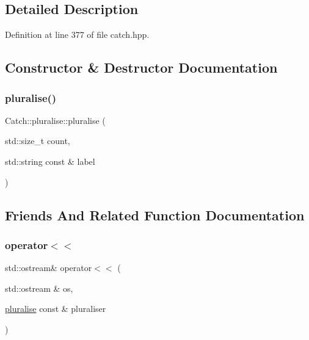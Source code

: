 \subsection{Detailed Description}


Definition at line 377 of file catch.\+hpp.



\subsection{Constructor \& Destructor Documentation}
\hypertarget{struct_catch_1_1pluralise_a5c55e22de2416cfe416edf715c6b9234}{}\label{struct_catch_1_1pluralise_a5c55e22de2416cfe416edf715c6b9234} 
\subsubsection{\texorpdfstring{pluralise()}{pluralise()}}
{\footnotesize\ttfamily Catch\+::pluralise\+::pluralise (\begin{DoxyParamCaption}\item[{std\+::size\+\_\+t}]{count,  }\item[{std\+::string const \&}]{label }\end{DoxyParamCaption})}



\subsection{Friends And Related Function Documentation}
\hypertarget{struct_catch_1_1pluralise_aa7dac6b165514c1f85e0695d678fdef5}{}\label{struct_catch_1_1pluralise_aa7dac6b165514c1f85e0695d678fdef5} 
\subsubsection{\texorpdfstring{operator$<$$<$}{operator<<}}
{\footnotesize\ttfamily std\+::ostream\& operator$<$$<$ (\begin{DoxyParamCaption}\item[{std\+::ostream \&}]{os,  }\item[{\hyperlink{struct_catch_1_1pluralise}{pluralise} const \&}]{pluraliser }\end{DoxyParamCaption})\hspace{0.3cm}{\ttfamily [friend]}}



